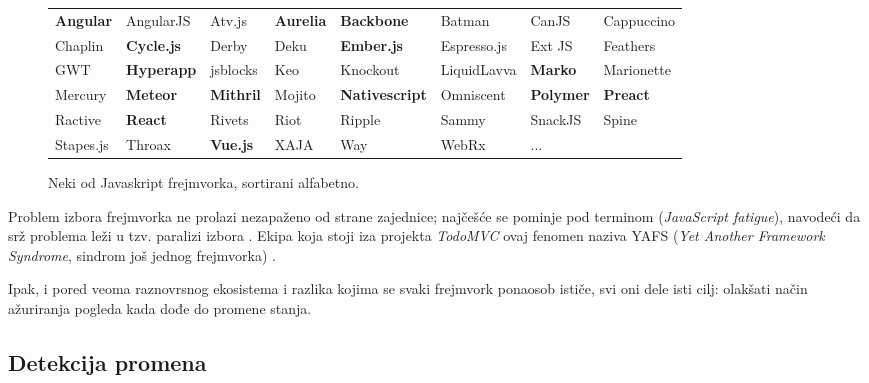\begin{figure}[tbh]
  \scriptsize
  \begin{center}
    \begin{tabularx}{\textwidth}{@{}llllllll@{}}

      \textbf{Angular} &
      AngularJS &
      Atv.js &
      \textbf{Aurelia} &
      \textbf{Backbone} &
      Batman &
      CanJS &
      Cappuccino \\
      Chaplin &
      \textbf{Cycle.js} &
      Derby &
      Deku &
      \textbf{Ember.js} &
      Espresso.js &
      Ext JS &
      Feathers \\
      GWT &
      \textbf{Hyperapp} &
      jsblocks &
      Keo &
      Knockout &
      LiquidLavva &
      \textbf{Marko} &
      Marionette \\
      Mercury &
      \textbf{Meteor} &
      \textbf{Mithril} &
      Mojito &
      \textbf{Nativescript} &
      Omniscent &
      \textbf{Polymer} &
      \textbf{Preact} \\
      Ractive &
      \textbf{React} &
      Rivets &
      Riot &
      Ripple &
      Sammy &
      SnackJS &
      Spine \\
      Stapes.js &
      Throax &
      \textbf{Vue.js} &
      XAJA &
      Way &
      WebRx &
      ... &
    \end{tabularx}
    \caption{Neki od Javaskript frejmvorka, sortirani alfabetno.}
    \label{fig:frameworks}
  \end{center}
\end{figure}

Problem izbora frejmvorka ne prolazi nezapaženo od strane zajednice; najčešće se pominje pod terminom  (\textsl{JavaScript fatigue}), navodeći da srž problema leži u tzv. paralizi izbora \cite{teropa:overcoming-javascript-framework-fatigue, auth0:fatigue, addy:choice-paralysis}.
Ekipa koja stoji iza projekta \textsl{TodoMVC} ovaj fenomen naziva YAFS (\textsl{Yet Another Framework Syndrome}, sindrom još jednog frejmvorka) \cite{tastejs:yafs}.

Ipak, i pored veoma raznovrsnog ekosistema i razlika kojima se svaki frejmvork ponaosob ističe, svi oni dele isti cilj: olakšati način ažuriranja pogleda kada dođe do promene stanja.

\subsection{Detekcija promena}

